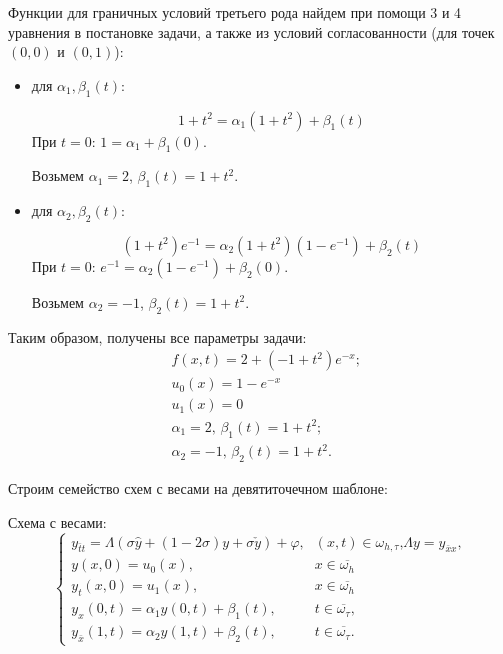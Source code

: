 Функции для граничных условий третьего рода найдем при помощи 3 и 4 уравнения в постановке задачи, а также из условий согласованности (для точек $(0,0)$ и $(0,1)$):
\begin{itemize}
\item { для $\alpha_{1}, \beta_{1}(t)$: \par
\begin{equation*}
1+t^{2}=\alpha_{1}(1+t^{2}) + \beta_{1}(t)
\end{equation*}
При $t=0$: $1=\alpha_{1} + \beta_{1}(0)$. \par
Возьмем $\alpha_{1}=2$, $\beta_{1}(t)=1+t^{2}$.
}
\item { для $\alpha_{2}, \beta_{2}(t)$: \par
\begin{equation*}
(1+t^{2})e^{-1}=\alpha_{2}(1+t^{2})(1-e^{-1}) + \beta_{2}(t)
\end{equation*}
При $t=0$: $e^{-1}=\alpha_{2}(1-e^{-1}) + \beta_{2}(0)$. \par
Возьмем $\alpha_{2}=-1$, $\beta_{2}(t)=1+t^{2}$.
}
\end{itemize}
Таким образом, получены все параметры задачи:
\begin{eqnarray}
& f(x,t)=2+(-1+t^{2})e^{-x}\text{;} \nonumber \\
& u_{0}(x)=1 - e^{-x} \nonumber \\
& u_{1}(x)=0 \\
& \alpha_{1}=2\text{, }\beta_{1}(t)=1+t^{2}\text{;} \nonumber \\
& \alpha_{2}=-1\text{, }\beta_{2}(t)=1+t^{2}\text{.} \nonumber
\end{eqnarray} \par

Строим семейство схем с весами на девятиточечном шаблоне:

Схема с весами:
\begin{equation}
\left\{
\begin{array}{ll}
y_{\bar{t}t} = \Lambda (\sigma \hat{y} + (1-2\sigma)y + \sigma \check{y}) + \varphi \text{,} & (x,t)\in \omega_{h,\tau} \text{,} \Lambda y = y_{\bar{x}x} \text{,} \\
y(x,0) = u_{0}(x) \text{,} & x \in \overline{\omega_{h}} \\
y_{t}(x,0) = u_{1}(x) \text{,} & x \in \overline{\omega_{h}} \\
y_{x}(0,t) = \alpha_{1}y(0,t)+\beta_{1}(t)\text{,} & t \in \overline{\omega_{\tau}} \text{,} \\
y_{\bar{x}}(1,t) = \alpha_{2}y(1,t)+\beta_{2}(t)\text{,} & t \in \overline{\omega_{\tau}} \text{.}
\end{array}
\right.
\end{equation}

